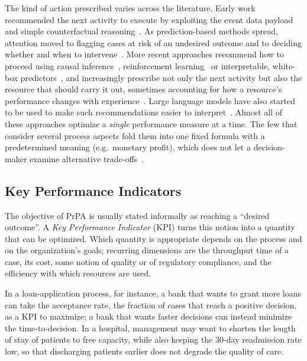 The kind of action prescribed varies across the literature. Early work
recommended the next activity to execute by exploiting the event data payload
and simple counterfactual reasoning~\cite{groger2014}. As prediction-based
methods spread, attention moved to flagging cases at risk of an undesired
outcome and to deciding whether and when to
intervene~\cite{teinemaa2018,fahrenkrogpetersen2022}. More recent approaches
recommend how to proceed using causal inference~\cite{bozorgi2021prescriptive, bozorgi2023},
reinforcement learning~\cite{branchi2022,metzger2020,shoush2022} or
interpretable, white-box predictors~\cite{padella2022}, and increasingly
prescribe not only the next activity but also the resource that should carry
it out, sometimes accounting for how a resource's performance changes with
experience~\cite{padella2024}. Large language models have also started to be
used to make such recommendations easier to interpret~\cite{kubrak2024}.
Almost all of these approaches optimize a \emph{single} performance measure
at a time. The few that consider several process aspects fold them into one
fixed formula with a predetermined meaning (e.g.\ monetary profit), which
does not let a decision-maker examine alternative
trade-offs~\cite{le2025balancing}.

    \subsection{Key Performance Indicators}
    \label{subsec:bg:prpa:kpi}
    The objective of PrPA is usually stated informally as reaching a
    ``desired outcome''. A \emph{Key Performance Indicator} (KPI) turns this
    notion into a quantity that can be optimized. Which quantity is
    appropriate depends on the process and on the organization's goals;
    recurring dimensions are the throughput time of a case, its cost, some
    notion of quality or of regulatory compliance, and the efficiency with
    which resources are used.

    In a loan-application process, for instance, a bank that wants to grant
    more loans can take the acceptance rate, the fraction of cases that reach
    a positive decision, as a KPI to maximize; a bank that wants faster
    decisions can instead minimize the time-to-decision. In a hospital, management may want to shorten
    the length of stay of patients to free capacity, while also
    keeping the 30-day readmission rate low, so that discharging patients
    earlier does not degrade the quality of care.

